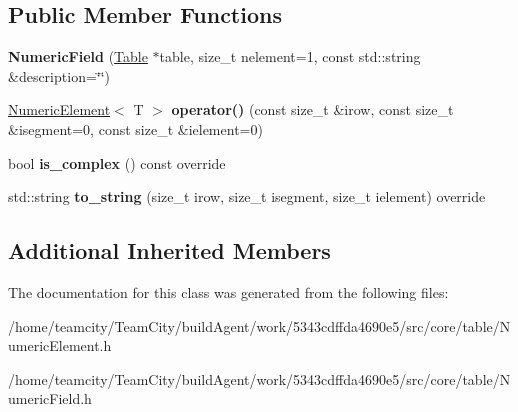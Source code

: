 \subsection*{Public Member Functions}
\begin{DoxyCompactItemize}
\item 
{\bfseries Numeric\+Field} (\hyperlink{classTable}{Table} $\ast$table, size\+\_\+t nelement=1, const std\+::string \&description=\char`\"{}\char`\"{})\hypertarget{classNumericField_a6d7995b8ceaf2dacb70bac6d36e4d22d}{}\label{classNumericField_a6d7995b8ceaf2dacb70bac6d36e4d22d}

\item 
\hyperlink{classNumericElement}{Numeric\+Element}$<$ T $>$ {\bfseries operator()} (const size\+\_\+t \&irow, const size\+\_\+t \&isegment=0, const size\+\_\+t \&ielement=0)\hypertarget{classNumericField_a14e5e07e53f4f3cf2a66241d1b61e7b6}{}\label{classNumericField_a14e5e07e53f4f3cf2a66241d1b61e7b6}

\item 
bool {\bfseries is\+\_\+complex} () const override\hypertarget{classNumericField_abd6e2c46cf5d17fc439556a071ddfd73}{}\label{classNumericField_abd6e2c46cf5d17fc439556a071ddfd73}

\item 
std\+::string {\bfseries to\+\_\+string} (size\+\_\+t irow, size\+\_\+t isegment, size\+\_\+t ielement) override\hypertarget{classNumericField_aaf5df8fe0c9cdb5007d6de32cf683b24}{}\label{classNumericField_aaf5df8fe0c9cdb5007d6de32cf683b24}

\end{DoxyCompactItemize}
\subsection*{Additional Inherited Members}


The documentation for this class was generated from the following files\+:\begin{DoxyCompactItemize}
\item 
/home/teamcity/\+Team\+City/build\+Agent/work/5343cdffda4690e5/src/core/table/Numeric\+Element.\+h\item 
/home/teamcity/\+Team\+City/build\+Agent/work/5343cdffda4690e5/src/core/table/Numeric\+Field.\+h\end{DoxyCompactItemize}
